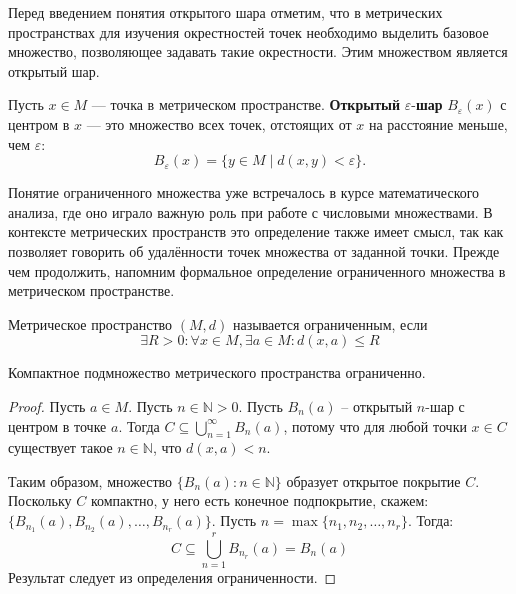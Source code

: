 Перед введением понятия открытого шара отметим, что в метрических пространствах для изучения окрестностей точек необходимо выделить базовое множество, позволяющее задавать такие окрестности. Этим множеством является открытый шар.

\begin{definition}
	Пусть \( x \in M \) — точка в метрическом пространстве. \textbf{Открытый} \( \varepsilon \)-\textbf{шар} \( B_\varepsilon(x) \) с центром в \( x \) — это множество всех точек, отстоящих от \( x \) на расстояние меньше, чем \( \varepsilon \):
	\[
	B_\varepsilon(x) = \{ y \in M \mid d(x, y) < \varepsilon \}.
	\]
\end{definition}

Понятие ограниченного множества уже встречалось в курсе математического анализа, где оно играло важную роль при работе с числовыми множествами. В контексте метрических пространств это определение также имеет смысл, так как позволяет говорить об удалённости точек множества от заданной точки. Прежде чем продолжить, напомним формальное определение ограниченного множества в метрическом пространстве.

\begin{definition}[Ограниченность]
	Метрическое пространство \( (M,d) \) называется ограниченным, если 
\[ \exists R > 0 : \forall x \in M, \exists a \in M : d(x,a) \leq R \]
\end{definition}

\begin{statement}
	Компактное подмножество метрического пространства ограниченно.
\end{statement}
\begin{proof}
	Пусть \( a \in M \). Пусть \( n \in \mathbb{N} > 0 \). Пусть \( B_n(a) \) -- открытый \( n \)-шар с центром в точке \( a \). Тогда \( C \subseteq \bigcup_{n=1}^{\infty} B_n(a) \), потому что для любой точки \( x \in C \) существует такое \( n \in \mathbb{N} \), что \( d(x, a) < n \).

Таким образом, множество \( \{ B_n(a) : n \in \mathbb{N} \} \) образует открытое покрытие \( C \). Поскольку \( C \) компактно, у него есть конечное подпокрытие, скажем: \( \{ B_{n_1}(a), B_{n_2}(a), \ldots, B_{n_r}(a) \} \). Пусть \( n = \max\{ n_1, n_2, \ldots, n_r \} \). Тогда:
\[ C \subseteq \bigcup_{n=1}^{r} B_{n_r}(a) = B_n(a) \]
Результат следует из определения ограниченности.
\end{proof}

